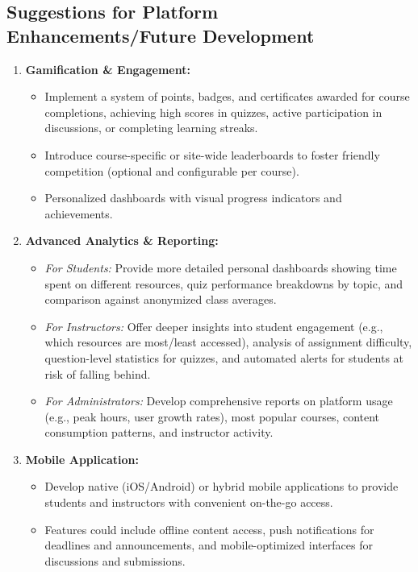 \subsection*{Suggestions for Platform Enhancements/Future Development}

\begin{enumerate}
    \item \textbf{Gamification \& Engagement:}
    \begin{itemize}
        \item Implement a system of points, badges, and certificates awarded for course completions, achieving high scores in quizzes, active participation in discussions, or completing learning streaks.
        \item Introduce course-specific or site-wide leaderboards to foster friendly competition (optional and configurable per course).
        \item Personalized dashboards with visual progress indicators and achievements.
    \end{itemize}
    \item \textbf{Advanced Analytics \& Reporting:}
    \begin{itemize}
        \item \textit{For Students:} Provide more detailed personal dashboards showing time spent on different resources, quiz performance breakdowns by topic, and comparison against anonymized class averages.
        \item \textit{For Instructors:} Offer deeper insights into student engagement (e.g., which resources are most/least accessed), analysis of assignment difficulty, question-level statistics for quizzes, and automated alerts for students at risk of falling behind.
        \item \textit{For Administrators:} Develop comprehensive reports on platform usage (e.g., peak hours, user growth rates), most popular courses, content consumption patterns, and instructor activity.
    \end{itemize}
    \item \textbf{Mobile Application:}
    \begin{itemize}
        \item Develop native (iOS/Android) or hybrid mobile applications to provide students and instructors with convenient on-the-go access.
        \item Features could include offline content access, push notifications for deadlines and announcements, and mobile-optimized interfaces for discussions and submissions.

\end{itemize}
\end{enumerate}

